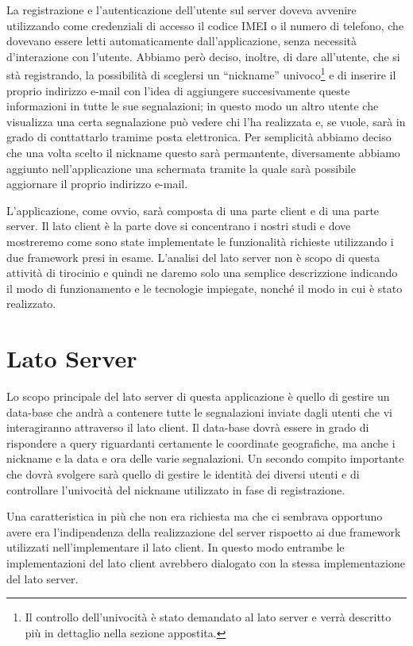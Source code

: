 	La registrazione e l'autenticazione dell'utente sul server doveva avvenire 
	utilizzando come credenziali di accesso il codice IMEI o il numero di
	telefono, che dovevano essere letti automaticamente dall'applicazione,
	senza necessità d'interazione con l'utente. Abbiamo però deciso, inoltre, di
	dare all'utente, che si stà registrando, la possibilità di sceglersi un
	``nickname'' univoco\footnote{Il controllo dell'univocità è stato demandato
	al lato server e verrà descritto più in dettaglio nella sezione appostita.}
	e di inserire il proprio indirizzo e-mail con l'idea di aggiungere
	succesivamente queste informazioni in tutte le sue segnalazioni; in questo
	modo un altro utente che visualizza una certa segnalazione può vedere chi
	l'ha realizzata e, se vuole, sarà in grado di conttattarlo tramime posta
	elettronica. Per semplicità abbiamo deciso che una volta scelto il nickname
	questo sarà permantente, diversamente abbiamo aggiunto nell'applicazione una
	schermata tramite la quale sarà possibile aggiornare il proprio indirizzo
	e-mail.
	
	L'applicazione, come ovvio, sarà composta di una parte client e di una parte
	server. Il lato client è la parte dove si concentrano i nostri studi e dove
	mostreremo come sono state implementate le funzionalità richieste
	utilizzando i due framework presi in esame. L'analisi del lato server non
	è scopo di questa attività di tirocinio e quindi ne daremo solo una
	semplice descrizzione indicando il modo di funzionamento e le tecnologie
	impiegate, nonché il modo in cui è stato realizzato.
	
	\section{Lato Server}
		Lo scopo principale del lato server di questa applicazione è quello di
		gestire un data-base che andrà a contenere tutte le segnalazioni inviate
		dagli utenti che vi interagiranno attraverso il lato client. Il
		data-base dovrà essere in grado di rispondere a query riguardanti
		certamente le coordinate geografiche, ma anche i nickname e la data e
		ora delle varie segnalazioni. Un secondo compito importante che dovrà
		svolgere sarà quello di gestire le identità dei diversi utenti e di
		controllare l'univocità del nickname utilizzato in fase di
		registrazione.
		
		Una caratteristica in più che non era richiesta ma che ci sembrava
		opportuno avere era l'indipendenza della realizzazione del server
		rispoetto ai due framework utilizzati nell'implementare il lato client.
		In questo modo entrambe le implementazioni del lato client avrebbero
		dialogato con la stessa implementazione del lato server.
		
